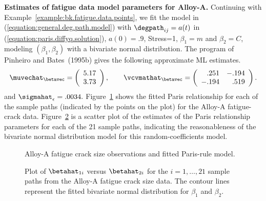\begin{example}{\bfseries Estimates of fatigue data model parameters 
for Alloy-A.}
\label{example:bk.fatigue.data.basic.estimate}
Continuing with Example~\ref{example:bk.fatigue.data.points}, we fit
the model in (\ref{equation:general.deg.path.model}) with
$\degpath_{ij}=a(t)$ in
(\ref{equation:paris.diffyq.solution}), $a(0)=.9$,
Stress=1, $\beta_{1}=m$ and $\beta_{2}=C$, modeling
$(\beta_{1},\beta_{2})$ with a bivariate normal distribution.  The
program of Pinheiro and Bates~(1995b) gives the following
approximate ML estimates.
\begin{displaymath}  
\muvechat_{\betavec} =
\left( \begin{array}{c}  5.17 \\3.73 
       \end{array}
\right), \qquad
\vcvmathat_{\betavec} =
\left( \begin{array}{rr}
       .251  & -.194 \\
      -.194 &   .519
      \end{array}
\right).
\end{displaymath}
and $\sigmahat_{\epsilon}=.0034.$
Figure~\ref{figure:bk.fatigue.data.fit.ps} shows the fitted Paris relationship
for each of the sample paths (indicated by the points on the plot) 
for the Alloy-A fatigue-crack data.
Figure~\ref{figure:bk.fatigue.data.bvn.ps} is a scatter plot of the
estimates of the Paris relationship parameters for each of the 21 sample
paths,
indicating the reasonableness of the bivariate normal distribution
model for this random-coefficients model.
\begin{figure}
\caption{Alloy-A fatigue crack size observations and fitted Paris-rule model.}
\label{figure:bk.fatigue.data.fit.ps}
\end{figure}
\begin{figure}
\caption{Plot of $\betahat_{1i}$ 
versus $\betahat_{2i}$ for the $i=1,\dots, 21$ sample paths from the
Alloy-A fatigue crack size data. The contour lines represent the
fitted bivariate normal distribution for $\beta_{1}$ and $\beta_{2}$.}
\label{figure:bk.fatigue.data.bvn.ps}
\end{figure}
\end{example}

